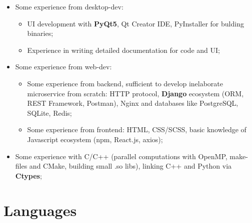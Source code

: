 \documentclass[12pt,a4paper]{moderncv}
\begin{document}
{\begin{itemize}
\begin{itemize}
        \item Proficient with \textbf{numpy, pandas, sklearn}; GPFlow, GPy for work with GP models; botorch, bayes\_opt for Bayesian optimization, 
        gradient boosting with \textbf{CatBoost}; experience with Torch framework; \newline
        \item Advanced work with \textbf{LaTeX} for scientific texts and presentations; \newline
    \end{itemize} 
 \item Some experience from desktop-dev:\newline
    \begin{itemize}
        \item UI development with \textbf{PyQt5}, Qt Creator IDE, PyInstaller for bulding binaries; \newline
        \item Experience in writing detailed documentation for code and UI; \newline
    \end{itemize}
 \item Some experience from web-dev: \newline
    \begin{itemize}
        \item Some experience from backend, sufficient to develop inelaborate microservice from scratch: 
          HTTP protocol, \textbf{Django} ecosystem (ORM, REST Framework, Postman), Nginx and databases like PostgreSQL, SQLite, Redis;\newline
        \item Some experience from frontend: 
          HTML, CSS/SCSS, basic knowledge of Javascript ecosystem (npm, React.js, axios); \newline
    \end{itemize}
 \item Some experience with C/C++ (parallel computations with OpenMP, make-files and CMake, building small .so libs), linking C++ and Python via \textbf{Ctypes}; \newline \newline
\end{itemize}
}{}{}{}{}
\section{Languages}
\end{document}
